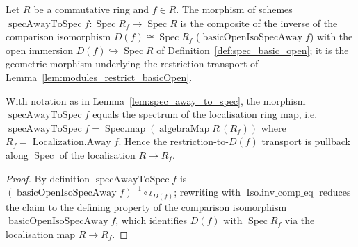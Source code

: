 \begin{lemma}\leanok
  \label{lem:spec_away_to_spec}
  Let \(R\) be a commutative ring and \(f \in R\). The morphism of schemes
  \(\operatorname{specAwayToSpec} f : \operatorname{Spec} R_f \to \operatorname{Spec} R\) is the
  composite of the inverse of the comparison isomorphism \(D(f) \cong \operatorname{Spec} R_f\)
  (\(\operatorname{basicOpenIsoSpecAway} f\)) with the open immersion
  \(D(f) \hookrightarrow \operatorname{Spec} R\) of Definition~\ref{def:spec_basic_open}; it is the
  geometric morphism underlying the restriction transport of
  Lemma~\ref{lem:modules_restrict_basicOpen}.
\end{lemma}

\begin{lemma}\leanok
  \label{lem:spec_away_to_spec_eq}
  With notation as in Lemma~\ref{lem:spec_away_to_spec}, the morphism
  \(\operatorname{specAwayToSpec} f\) equals the spectrum of the localisation ring map, i.e.\
  \(\operatorname{specAwayToSpec} f = \operatorname{Spec.map}(\operatorname{algebraMap} R\,(R_f))\)
  where \(R_f = \operatorname{Localization.Away} f\). Hence the restriction-to-\(D(f)\) transport is
  pullback along \(\operatorname{Spec}\) of the localisation \(R \to R_f\).
\end{lemma}
\begin{proof}
  \leanok
  By definition \(\operatorname{specAwayToSpec} f\) is
  \((\operatorname{basicOpenIsoSpecAway} f)^{-1} \circ \iota_{D(f)}\); rewriting with
  \(\operatorname{Iso.inv\_comp\_eq}\) reduces the claim to the defining property of the comparison
  isomorphism \(\operatorname{basicOpenIsoSpecAway} f\), which identifies \(D(f)\) with
  \(\operatorname{Spec} R_f\) via the localisation map \(R \to R_f\).
\end{proof}

